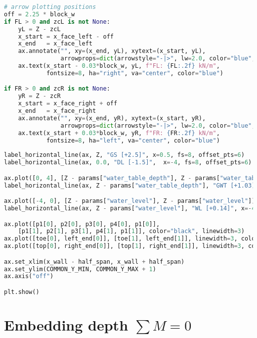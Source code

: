 \begin{lstlisting}[language=Python]
# arrow plotting positions
off = 2.25 * block_w
if FL > 0 and zcL is not None:
    yL = Z - zcL
    x_start = x_face_left - off
    x_end   = x_face_left
    ax.annotate("", xy=(x_end, yL), xytext=(x_start, yL),
                arrowprops=dict(arrowstyle="-|>", lw=2.0, color="blue", mutation_scale=12))
    ax.text(x_start - 0.03*block_w, yL, f"FL: {FL:.2f} kN/m",
            fontsize=8, ha="right", va="center", color="blue")

if FR > 0 and zcR is not None:
    yR = Z - zcR
    x_start = x_face_right + off
    x_end   = x_face_right
    ax.annotate("", xy=(x_end, yR), xytext=(x_start, yR),
                arrowprops=dict(arrowstyle="-|>", lw=2.0, color="blue", mutation_scale=12))
    ax.text(x_start + 0.03*block_w, yR, f"FR: {FR:.2f} kN/m",
            fontsize=8, ha="left", va="center", color="blue")
    
label_horizontal_line(ax, Z, "GS [+2.5]", x=0.5, fs=8, offset_pts=6)
label_horizontal_line(ax, 0.0, "DL [-1.5]",  x=-4, fs=8, offset_pts=6)

ax.plot([0, 4], [Z - params["water_table_depth"], Z - params["water_table_depth"]], linestyle="--", linewidth=1.5, color="black")
label_horizontal_line(ax, Z - params["water_table_depth"], "GWT [+1.03]", x=0.5, fs=8, offset_pts=6)

ax.plot([-4, 0], [Z - params["water_level"], Z - params["water_level"]], linestyle="--", linewidth=1.5, color="black")
label_horizontal_line(ax, Z - params["water_level"], "WL [+0.14]", x=-4, fs=8, offset_pts=6)

ax.plot([p1[0], p2[0], p3[0], p4[0], p1[0]],
    [p1[1], p2[1], p3[1], p4[1], p1[1]], color="black", linewidth=3)
ax.plot([toe[0], left_end[0]], [toe[1], left_end[1]], linewidth=3, color="black")
ax.plot([top[0], right_end[0]], [top[1], right_end[1]], linewidth=3, color="black")

ax.set_xlim(x_wall - half_span, x_wall + half_span)
ax.set_ylim(COMMON_Y_MIN, COMMON_Y_MAX + 1)
ax.axis("off")

plt.show()
\end{lstlisting}

\section{Embedding depth $\sum M=0$}

